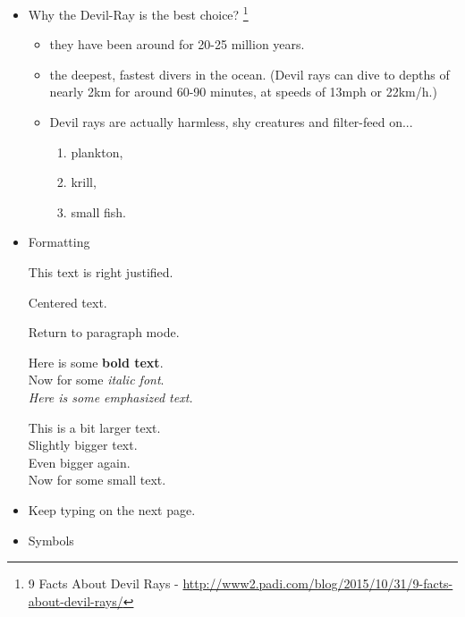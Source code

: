 \begin{itemize}
    \item Why the Devil-Ray is the best choice? 
    \footnote{9 Facts About Devil Rays - \url{http://www2.padi.com/blog/2015/10/31/9-facts-about-devil-rays/}}
 
    \begin{itemize}
    

 
        \item they have been around for 20-25 million years.
        
        \item the deepest, fastest divers in the ocean. (Devil rays can dive to depths of nearly 2km for around 60-90 minutes, at speeds of 13mph or 22km/h.)
        
        \item Devil rays are actually harmless, shy creatures and filter-feed on...
        
        \begin{enumerate}
            \item plankton,
            \item krill,
            \item small fish.
            
        \end{enumerate}
    \end{itemize}
    
    \item Formatting
    \begin{flushright} This text is right justified.
    \end{flushright}
    \begin{center} Centered text.
    \end{center}

Return to paragraph mode.

Here is some \textbf{bold text}.\\
Now for some \textit{italic font}.\\
\emph{Here is some  \emph{emphasized text.}}

This is {\large a bit larger} text.\\
Slightly {\Large bigger} text.\\
Even {\LARGE bigger} again.\\
Now for some {\small small} text.

    \item Keep typing on the next page.
    
    \item Symbols
    

\end{itemize}
